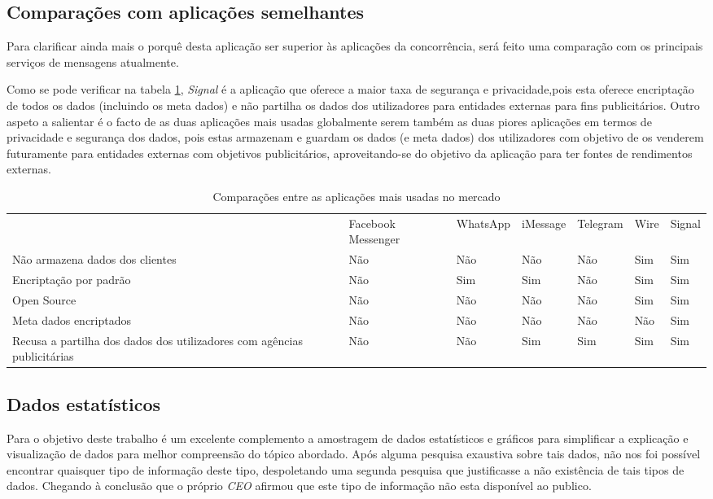 \subsection{Comparações com aplicações semelhantes}
\label{sec:comparacoes}
Para clarificar ainda mais o porquê desta aplicação ser superior às aplicações da concorrência, será feito uma comparação com os principais serviços de mensagens atualmente.

Como se pode verificar na tabela \ref{tab:comparacoes}, \textit{Signal} é a aplicação que oferece a maior taxa de segurança e privacidade,pois esta oferece encriptação de todos os dados (incluindo os meta dados) e não partilha os dados dos utilizadores para entidades externas para fins publicitários.
Outro aspeto a salientar é o facto de as duas aplicações mais usadas globalmente serem também as duas piores aplicações em termos de privacidade e segurança dos dados, pois estas armazenam e guardam os dados (e meta dados) dos utilizadores com objetivo de os venderem futuramente para entidades externas com objetivos publicitários, aproveitando-se do objetivo da aplicação para ter fontes de rendimentos externas.

\begin{table}[!h]

\centering
\begin{adjustbox}{width=1\textwidth}
\begin{tabular}{lllllll}
                                & Facebook Messenger & WhatsApp & iMessage & Telegram & Wire & Signal \\
Não armazena dados dos clientes & Não                & Não      & Não      & Não      & Sim  & Sim    \\
Encriptação por padrão          & Não                & Sim      & Sim      & Não      & Sim  & Sim    \\
Open Source                     & Não                & Não      & Não      & Não      & Sim  & Sim    \\
Meta dados encriptados          & Não                & Não      & Não      & Não      & Não  & Sim    \\
Recusa a partilha dos dados dos utilizadores com agências publicitárias & Não & Não & Sim & Sim & Sim & Sim
\end{tabular}
\label{tab:comparacoes}
\end{adjustbox}
\caption{Comparações entre as aplicações mais usadas no mercado}
\end{table}


\subsection{Dados estatísticos}
\label{sec:estatis}
Para o objetivo deste trabalho é um excelente complemento a amostragem de dados estatísticos e gráficos para simplificar a explicação e visualização de dados para melhor compreensão do tópico abordado.
Após alguma pesquisa exaustiva sobre tais dados, não nos foi possível encontrar quaisquer tipo de informação deste tipo, despoletando uma segunda pesquisa que justificasse a não existência de tais tipos de dados. Chegando à conclusão que o próprio \textit{CEO} afirmou que este tipo de informação não esta disponível ao publico.


